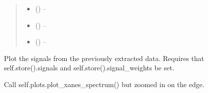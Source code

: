 \documentclass[letterpaper,10pt,english]{sphinxmanual}
\begin{document}
\begin{fulllineitems}
\begin{fulllineitems}
\begin{quote}
\begin{description}
\begin{itemize}
\item {} 
 (\sphinxstyleliteralemphasis{-}) -- 

\item {} 
\sphinxstyleliteralstrong{ (}\sphinxstyleliteralstrong{)}\sphinxstyleliteralstrong{} () -- 

\item {} 
 () -- 

\end{itemize}

\end{description}\end{quote}

\end{fulllineitems}


\begin{fulllineitems}
\label{\detokenize{xanespy:xanespy.xanes_frameset.XanesFrameset.plot_signals}}
Plot the signals from the previously extracted data. Requires that
self.store().signals and self.store().signal\_weights be
set.

\end{fulllineitems}


\begin{fulllineitems}
\label{\detokenize{xanespy:xanespy.xanes_frameset.XanesFrameset.plot_xanes_edge}}
Call self.plots.plot\_xanes\_spectrum() but zoomed in on the edge.

\end{fulllineitems}



\end{fulllineitems}
\end{document}
